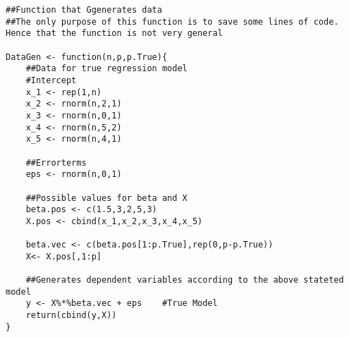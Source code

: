 \documentclass[Research_Module_ES.tex]{subfiles}
\begin{document}
\begin{lstlisting}[title={Data Generating Process}]
##Function that Ggenerates data
##The only purpose of this function is to save some lines of code. Hence that the function is not very general

DataGen <- function(n,p,p.True){
	##Data for true regression model
	#Intercept
	x_1 <- rep(1,n)         
	x_2 <- rnorm(n,2,1)
	x_3 <- rnorm(n,0,1)
	x_4 <- rnorm(n,5,2)
	x_5 <- rnorm(n,4,1)
	
	##Errorterms
	eps <- rnorm(n,0,1)     

	##Possible values for beta and X
	beta.pos <- c(1.5,3,2,5,3)
	X.pos <- cbind(x_1,x_2,x_3,x_4,x_5)

	beta.vec <- c(beta.pos[1:p.True],rep(0,p-p.True)) 
	X<- X.pos[,1:p]

	##Generates dependent variables according to the above stateted model
	y <- X%*%beta.vec + eps    #True Model
	return(cbind(y,X))
}

\end{lstlisting}
\end{document}

